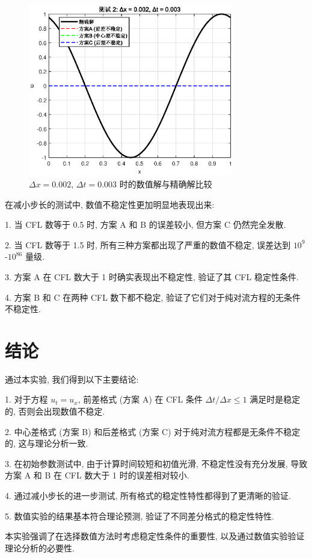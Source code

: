 \documentclass[12pt]{article}
\begin{document}
\begin{figure}[H]
\centering
\includegraphics[width=0.8\textwidth]{fig/result_0003.eps}
\caption{$\Delta x = 0.002$, $\Delta t = 0.003$ 时的数值解与精确解比较}
\end{figure}

在减小步长的测试中, 数值不稳定性更加明显地表现出来:

1. 当 CFL 数等于 0.5 时, 方案 A 和 B 的误差较小, 但方案 C 仍然完全发散.

2. 当 CFL 数等于 1.5 时, 所有三种方案都出现了严重的数值不稳定, 误差达到 $10^9$-$10^{86}$ 量级.

3. 方案 A 在 CFL 数大于 1 时确实表现出不稳定性, 验证了其 CFL 稳定性条件.

4. 方案 B 和 C 在两种 CFL 数下都不稳定, 验证了它们对于纯对流方程的无条件不稳定性.

\section{结论}

通过本实验, 我们得到以下主要结论:

1. 对于方程 $u_t = u_x$, 前差格式 (方案 A) 在 CFL 条件 $\Delta t / \Delta x \leq 1$ 满足时是稳定的, 否则会出现数值不稳定.

2. 中心差格式 (方案 B) 和后差格式 (方案 C) 对于纯对流方程都是无条件不稳定的, 这与理论分析一致.

3. 在初始参数测试中, 由于计算时间较短和初值光滑, 不稳定性没有充分发展, 导致方案 A 和 B 在 CFL 数大于 1 时的误差相对较小.

4. 通过减小步长的进一步测试, 所有格式的稳定性特性都得到了更清晰的验证.

5. 数值实验的结果基本符合理论预测, 验证了不同差分格式的稳定性特性.

本实验强调了在选择数值方法时考虑稳定性条件的重要性, 以及通过数值实验验证理论分析的必要性.
\end{document}

